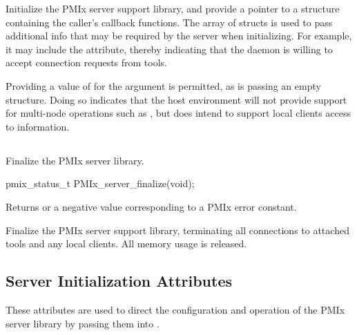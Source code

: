 \optattrend

\descr

Initialize the \ac{PMIx} server support library, and provide a pointer to a  structure containing the caller's callback functions.
The array of  structs is used to pass additional info that may be required by the server when initializing.
For example, it may include the  attribute, thereby indicating that the daemon is willing to accept connection requests from tools.

\advicermstart
Providing a value of  for the  argument is permitted, as is passing an empty  structure. Doing so indicates that the host environment will not provide support for multi-node operations such as , but does intend to support local clients access to information.
\advicermend

\subsection{}

\summary

Finalize the PMIx server library.

\format

\cspecificstart
\begin{codepar}
pmix_status_t
PMIx_server_finalize(void);
\end{codepar}
\cspecificend

Returns  or a negative value corresponding to a PMIx error constant.

\descr

Finalize the \ac{PMIx} server support library, terminating all connections to attached tools and any local clients.
All memory usage is released.

\subsection{Server Initialization Attributes}
\label{chap:api_init:serverattrs}

These attributes are used to direct the configuration and operation of the \ac{PMIx} server library by passing them into .

